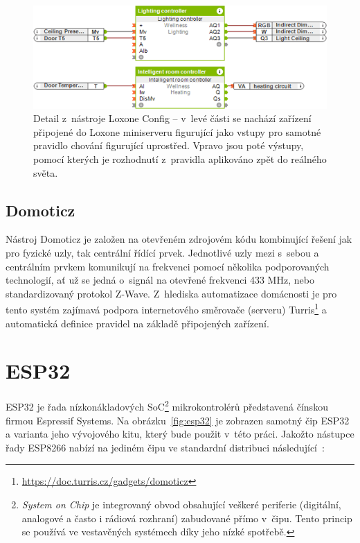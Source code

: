 \begin{figure}%
    \centering
    \includegraphics[width=.75\textwidth]{figures/iot-loxone-config.png}
    \caption{Detail z~nástroje Loxone Config -- v~levé části se nachází zařízení připojené do Loxone miniserveru
    figurující jako vstupy pro samotné pravidlo chování figurující uprostřed.
    Vpravo jsou poté výstupy, pomocí kterých je rozhodnutí z~pravidla aplikováno zpět do reálného světa\protect\footnotemark.}
    \label{fig:iot-loxone-config}
\end{figure}

\subsection{Domoticz}\label{subsec:domoticz}
Nástroj Domoticz je založen na otevřeném zdrojovém kódu kombinující řešení jak pro fyzické uzly, tak centrální řídící
prvek.
Jednotlivé uzly mezi s~sebou a centrálním prvkem komunikují na frekvenci pomocí několika podporovaných technologií,
ať už se jedná o~signál na otevřené frekvenci 433 MHz, nebo standardizovaný protokol Z-Wave.
Z~hlediska automatizace domácnosti je pro tento systém zajímavá podpora internetového směrovače (serveru)
Turris\footnote{\url{https://doc.turris.cz/gadgets/domoticz}} a automatická definice pravidel na základě připojených zařízení.

\section{ESP32}\label{sec:esp32}
ESP32 je řada nízkonákladových SoC\footnote{\textit{System on Chip} je integrovaný obvod obsahující veškeré
periferie (digitální, analogové a často i rádiová rozhraní) zabudované přímo v~čipu.
Tento princip se používá ve vestavěných systémech díky jeho nízké spotřebě.} mikrokontrolérů představená čínskou
firmou Espressif Systems.
Na obrázku~\ref{fig:esp32} je zobrazen samotný čip ESP32 a varianta jeho vývojového kitu, který bude použit v~této
práci.
Jakožto nástupce řady ESP8266 nabízí na jediném čipu ve standardní distribuci následující~\cite{ESP32Datasheet}:

